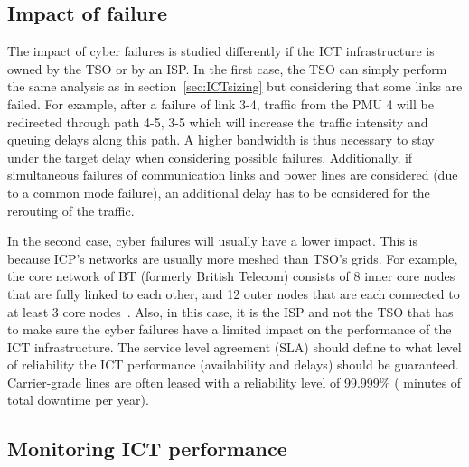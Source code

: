 
\subsection{Impact of failure}
\label{sec:ICTfailure}

The impact of cyber failures is studied differently if the ICT infrastructure is owned by the TSO or by an ISP. In the first case, the TSO can simply perform the same analysis as in section~\ref{sec:ICTsizing} but considering that some links are failed. For example, after a failure of link 3-4, traffic from the PMU 4 will be redirected through path 4-5, 3-5 which will increase the traffic intensity and queuing delays along this path. A higher bandwidth is thus necessary to stay under the target delay when considering possible failures. Additionally, if simultaneous failures of communication links and power lines are considered (due to a common mode failure), an additional delay has to be considered for the rerouting of the traffic.

In the second case, cyber failures will usually have a lower impact. This is because ICP's networks are usually more meshed than TSO's grids. For example, the core network of BT (formerly British Telecom) consists of 8 inner core nodes that are fully linked to each other, and 12 outer nodes that are each connected to at least 3 core nodes~\cite{BTnetwork}. Also, in this case, it is the ISP and not the TSO that has to make sure the cyber failures have a limited impact on the performance of the ICT infrastructure. The service level agreement (SLA) should define to what level of reliability the ICT performance (\ie availability and delays) should be guaranteed. Carrier-grade lines are often leased with a reliability level of 99.999\% ( minutes of total downtime per year).

\subsection{Monitoring ICT performance}
\label{sec:ICTmonitoring}

